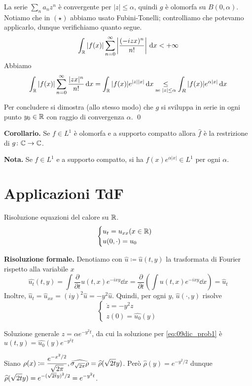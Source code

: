 La serie $\sum_n a_n z^n$ è convergente per $|z| \leq \alpha$, quindi $g$ è olomorfa su $B(0,\alpha)$.
Notiamo che in $(\star)$ abbiamo usato Fubini-Tonelli; controlliamo che potevamo applicarlo, dunque verifichiamo quanto segue.
%
$$
	\int_{\mathbb R} |f(x)| \sum_{n=0}^{\infty} \left| \frac{(-izx)^n}{n!} \right| \,\mathrm{d} x < + \infty
$$
%
Abbiamo
%
$$
	\int_\mathbb R |f(x)| \sum_{n=0}^{\infty} \frac{|zx|^n}{n!} \,\mathrm{d} x
	= \int_\mathbb R |f(x)| e^{|z| |x|} \,\mathrm{d} x
	\underset{\text{se } |z| \leq \alpha}{\leq} \int_R |f(x)| e^{\alpha |x|} \,\mathrm{d} x
$$
%

Per concludere si dimostra (allo stesso modo) che $g$ si sviluppa in serie in ogni punto $y_0 \in \mathbb R$ con raggio di convergenza $\alpha$.
\qed

\vs

\textbf{Corollario.} Se $f \in L^1$ è olomorfa e a supporto compatto allora $\hat{f}$ è la restrizione di $g \colon \mathbb C \to \mathbb C$.

\textbf{Nota.} Se $f \in L^1$ e a supporto compatto, si ha $f(x) e^{\alpha |x|} \in L^1$ per ogni $\alpha$.

\section{Applicazioni TdF}

Risoluzione equazioni del calore su $\mathbb R$.
%
$$
\begin{cases}
u_t = u_{xx} (x \in \mathbb R) \\
u(0,\cdot) = u_0
\end{cases} 
$$
%

\textbf{Risoluzione formale.}
Denotiamo con $\hat{u} \coloneqq \hat{u}(t,y)$ la trasformata di Fourier rispetto alla variabile $x$ 
%
$$
\hat{u_t}(t,y) = \int \frac{\partial}{\partial t} u(t,x) e^{-ixy} \dd x 
	= \frac{\partial}{\partial t} \left( \int u(t,x) e^{-ixy} \dd x \right) = \hat{u}_t
$$
%
Inoltre, $\hat{u}_t = \hat{u}_{xx} = (iy)^2 \hat{u} = -y^2\hat{u}$.
Quindi, per ogni $y$, $\hat{u}(\cdot,y)$ risolve
%
\begin{equation}
\label{eq:09dic_prob1}\tag{P}
\begin{cases}
	\dot z = -y^2 z \\
	z(0) = \hat{u_0}(y)
\end{cases} 
\end{equation}

Soluzione generale $z = \alpha e^{-y^2 t}$, da cui la soluzione per \eqref{eq:09dic_prob1} è $\hat{u}(t,y) = \hat{u_0}(y) e^{-y^2 t}$

Siano $\displaystyle \rho(x) \coloneqq \frac{e^{-x^2 / 2}}{\sqrt{2\pi}}, \widehat{\sigma_{\sqrt{2\pi}}\rho} = \widehat{\rho}(\sqrt{2t}y)$.
Però $\hat{\rho}(y) = e^{-y^2/2}$ dunque $\displaystyle \widehat{\rho}(\sqrt{2t}y) = e^{-(\sqrt{2t}y)^2 / 2} = e^{-y^2 t}$.

